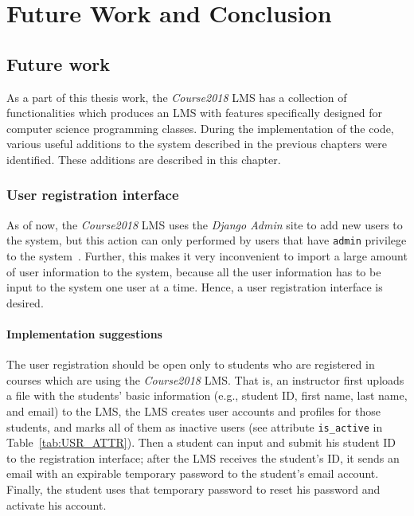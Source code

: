 

\chapter{Future Work and Conclusion}
\label{chap:FUTURE}

\section{Future work}
As a part of this thesis work, 
the \emph{Course2018} LMS has a collection of functionalities which produces an
LMS with features specifically designed for computer science programming
classes.
During the implementation of the code, various useful additions to the system
described in the previous chapters were identified.
These additions are described in this chapter.

\subsection{User registration interface}
As of now, the \emph{Course2018} LMS uses the \emph{Django Admin} site to
add new users to the system, but this action can only performed by users that
have \texttt{admin} privilege to the system~\cite{AdjangoAdmin}.
Further, this
makes it very inconvenient to import a large amount of user information to
the system, because all the user information has to be input to the system one
user at a time. Hence, a user registration interface is desired.

\subsubsection{Implementation suggestions}
The user registration should be open only to students
who are registered in courses which are using the \emph{Course2018} LMS.
That is, an instructor first uploads a file with the students' basic information
(e.g., student ID, first name, last name, and email) to the LMS, the LMS
creates user accounts and profiles for those students, and marks all of them
as inactive users (see attribute \texttt{is\_active} in
Table~\ref{tab:USR_ATTR}).
Then a student can input and submit his student ID to the registration
interface; after the LMS receives the student's ID,
it sends an email with an expirable temporary password to the student's
email account.
Finally, the student uses that temporary password to reset his password and
activate his account.

